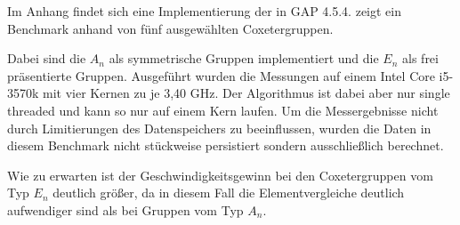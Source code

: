 Im Anhang findet sich eine Implementierung der 
in GAP 4.5.4.  zeigt ein Benchmark anhand von fünf
ausgewählten Coxetergruppen.

Dabei sind die $A_n$ als
symmetrische Gruppen implementiert und die $E_n$ als frei präsentierte Gruppen.
Ausgeführt wurden die Messungen auf einem Intel Core i5-3570k mit vier Kernen
zu je 3,40 GHz. Der Algorithmus ist dabei aber nur single threaded und kann so
nur auf einem Kern laufen. Um die Messergebnisse nicht durch Limitierungen des
Datenspeichers zu beeinflussen, wurden die Daten in diesem Benchmark nicht
stückweise persistiert sondern ausschließlich berechnet.

Wie zu erwarten ist der Geschwindigkeitsgewinn bei den Coxetergruppen vom Typ
$E_n$ deutlich größer, da in diesem Fall die Elementvergleiche deutlich
aufwendiger sind als bei Gruppen vom Typ $A_n$.

